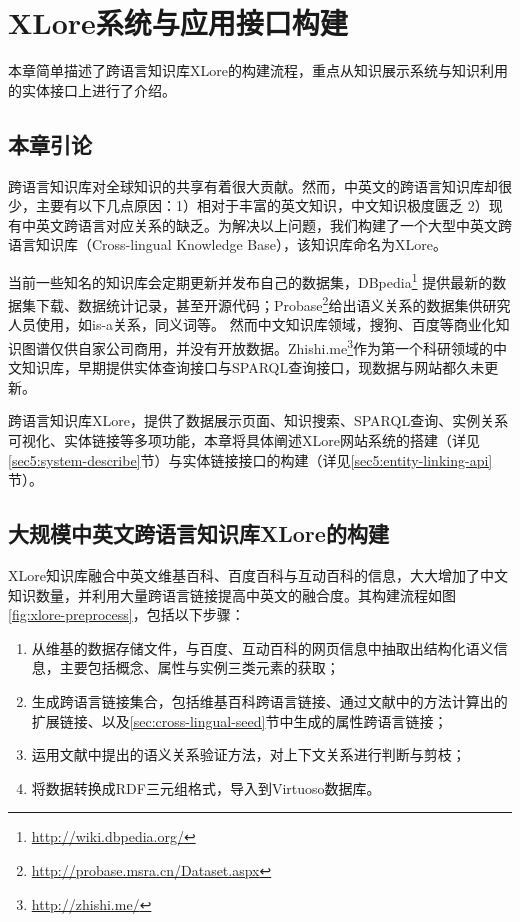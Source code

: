 \chapter{XLore系统与应用接口构建}
\label{cha:xlore}

本章简单描述了跨语言知识库XLore的构建流程，重点从知识展示系统与知识利用的实体接口上进行了介绍。

\section{本章引论}

跨语言知识库对全球知识的共享有着很大贡献。然而，中英文的跨语言知识库却很少，主要有以下几点原因：1）相对于丰富的英文知识，中文知识极度匮乏 2）现有中英文跨语言对应关系的缺乏。为解决以上问题，我们构建了一个大型中英文跨语言知识库（Cross-lingual Knowledge Base），该知识库命名为{\heiti XLore}。

当前一些知名的知识库会定期更新并发布自己的数据集，DBpedia\footnote{\url{http://wiki.dbpedia.org/}} 提供最新的数据集下载、数据统计记录，甚至开源代码；Probase\footnote{\url{http://probase.msra.cn/Dataset.aspx}}给出语义关系的数据集供研究人员使用，如is-a关系，同义词等。
然而中文知识库领域，搜狗、百度等商业化知识图谱仅供自家公司商用，并没有开放数据。Zhishi.me\footnote{\url{http://zhishi.me/}}作为第一个科研领域的中文知识库，早期提供实体查询接口与SPARQL查询接口，现数据与网站都久未更新。

跨语言知识库XLore，提供了数据展示页面、知识搜索、SPARQL查询、实例关系可视化、实体链接等多项功能，本章将具体阐述XLore网站系统的搭建（详见\ref{sec5:system-describe}节）与实体链接接口的构建（详见\ref{sec5:entity-linking-api}节）。

\section{大规模中英文跨语言知识库XLore的构建}
\label{sec5:cross-lingual-knowledge-base}

XLore知识库融合中英文维基百科、百度百科与互动百科的信息，大大增加了中文知识数量，并利用大量跨语言链接提高中英文的融合度。其构建流程如图\ref{fig:xlore-preprocess}，包括以下步骤：
\begin{enumerate}
\item 从维基的数据存储文件，与百度、互动百科的网页信息中抽取出结构化语义信息，主要包括概念、属性与实例三类元素的获取；
\item 生成跨语言链接集合，包括维基百科跨语言链接、通过文献\cite{wang2012cross}中的方法计算出的扩展链接、以及\ref{sec:cross-lingual-seed}节中生成的属性跨语言链接；
\item 运用文献\cite{wang2014cross}中提出的语义关系验证方法，对上下文关系进行判断与剪枝；
\item 将数据转换成RDF三元组格式，导入到Virtuoso数据库。
\end{enumerate}

